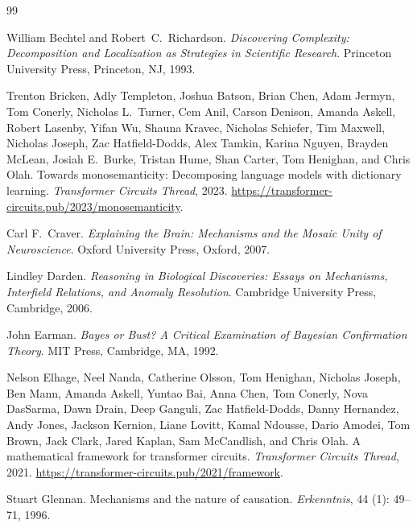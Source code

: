\documentclass[11pt]{article}
\theoremstyle{remark}
\begin{document}

\begin{thebibliography}{99}

William Bechtel and Robert~C.\ Richardson.
\newblock \emph{Discovering Complexity: Decomposition and Localization as
  Strategies in Scientific Research}.
\newblock Princeton University Press, Princeton, NJ, 1993.

Trenton Bricken, Adly Templeton, Joshua Batson, Brian Chen, Adam Jermyn,
  Tom Conerly, Nicholas L.\ Turner, Cem Anil, Carson Denison, Amanda Askell,
  Robert Lasenby, Yifan Wu, Shauna Kravec, Nicholas Schiefer, Tim Maxwell,
  Nicholas Joseph, Zac Hatfield-Dodds, Alex Tamkin, Karina Nguyen, Brayden
  McLean, Josiah E.\ Burke, Tristan Hume, Shan Carter, Tom Henighan, and
  Chris Olah.
\newblock Towards monosemanticity: Decomposing language models with dictionary
  learning.
\newblock \emph{Transformer Circuits Thread}, 2023.
\newblock \url{https://transformer-circuits.pub/2023/monosemanticity}.

Carl F.\ Craver.
\newblock \emph{Explaining the Brain: Mechanisms and the Mosaic Unity of
  Neuroscience}.
\newblock Oxford University Press, Oxford, 2007.

Lindley Darden.
\newblock \emph{Reasoning in Biological Discoveries: Essays on Mechanisms,
  Interfield Relations, and Anomaly Resolution}.
\newblock Cambridge University Press, Cambridge, 2006.

John Earman.
\newblock \emph{Bayes or Bust? A Critical Examination of Bayesian Confirmation
  Theory}.
\newblock MIT Press, Cambridge, MA, 1992.

Nelson Elhage, Neel Nanda, Catherine Olsson, Tom Henighan, Nicholas Joseph,
  Ben Mann, Amanda Askell, Yuntao Bai, Anna Chen, Tom Conerly, Nova DasSarma,
  Dawn Drain, Deep Ganguli, Zac Hatfield-Dodds, Danny Hernandez, Andy Jones,
  Jackson Kernion, Liane Lovitt, Kamal Ndousse, Dario Amodei, Tom Brown, Jack
  Clark, Jared Kaplan, Sam McCandlish, and Chris Olah.
\newblock A mathematical framework for transformer circuits.
\newblock \emph{Transformer Circuits Thread}, 2021.
\newblock \url{https://transformer-circuits.pub/2021/framework}.

Stuart Glennan.
\newblock Mechanisms and the nature of causation.
\newblock \emph{Erkenntnis}, 44 (1): 49--71, 1996.


\end{thebibliography}
\end{document}
